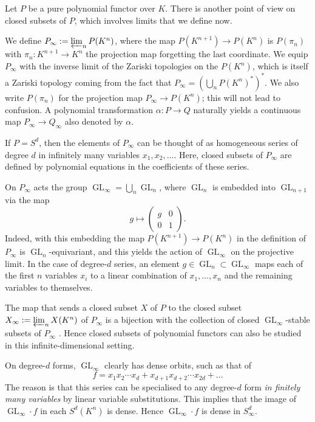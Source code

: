 \documentclass{amsart}
\theoremstyle{plain}
\theoremstyle{definition}
\DeclareMathOperator{\GL}{GL}
\begin{document}
Let $P$ be a pure polynomial functor over $K$.  There is
another point of view on closed subsets of $P$, which involves
limits that we define now.

\begin{de}
We define $P_\infty:=\varprojlim_n P(K^n)$, where the map $P(K^{n+1}) \to
P(K^n)$ is $P(\pi_n)$ with $\pi_n\colon K^{n+1} \to K^n$ the projection map forgetting
the last coordinate. We equip $P_\infty$ with the inverse limit of the
Zariski topologies on the $P(K^n)$, which is itself a Zariski topology
coming from the fact that $P_\infty=(\bigcup_n P(K^n)^*)^*$.
We also write $P(\pi_n)$ for the projection map $P_\infty \to
P(K^n)$; this will not lead to confusion. A polynomial
transformation $\alpha\colon P \to Q$ naturally yields a
continuous map $P_\infty \to Q_\infty$ also denoted by
$\alpha$.
\end{de}

If $P=S^d$, then the elements of $P_\infty$ can be thought of
as homogeneous series of degree $d$ in infinitely many variables
$x_1,x_2,\ldots$. Here, closed subsets of $P_\infty$ are defined by
polynomial equations in the coefficients of these series.

On $P_\infty$ acts the group $\GL_\infty=\bigcup_n \GL_n$,
where $\GL_n$ is embedded into $\GL_{n+1}$ via the map
\[
g \mapsto \begin{pmatrix} g & 0 \\ 0 & 1 \end{pmatrix}.
\]
Indeed, with this embedding the map $P(K^{n+1}) \to P(K^n)$
in the definition of $P_\infty$ is $\GL_n$-equivariant, and
this yields the action of $\GL_\infty$ on the projective
limit.
In the case of degree-$d$ series, an element $g\in\GL_n\subset\GL_\infty$ maps each of the first $n$ variables $x_i$ to a linear combination of
$x_1,\ldots,x_n$ and the remaining variables to themselves.

The map
that sends a closed subset $X$ of $P$ to the closed subset $X_\infty:=
\varprojlim_n X(K^n)$ of $P_\infty$ is a bijection with the collection
of closed $\GL_\infty$-stable subsets of $P_\infty$ \cite[Proposition 1.3.28]{B:thesis}. Hence closed subsets of polynomial functors can also be
studied in this infinite-dimensional setting.

\begin{ex}
On degree-$d$ forms, $\GL_\infty$ clearly has dense orbits, such as
that of
\[
f=x_1 x_2 \cdots x_d + x_{d+1} x_{d+2} \cdots x_{2d} + \ldots
\]
The reason is that this series can be specialised to any degree-$d$ form
{\em in finitely many variables} by linear variable substitutions. This
implies that the image of $\GL_\infty\! \cdot f$ in each $S^d(K^n)$ is dense.
Hence $\GL_\infty\!\cdot f$ is dense in $S^d_\infty$.
\end{ex}
\end{document}

